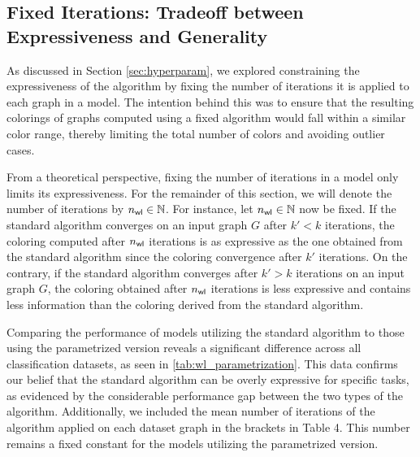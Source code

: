 \subsection{Fixed \wl Iterations: Tradeoff between Expressiveness and Generality}
As discussed in Section \ref{sec:hyperparam}, we explored constraining the expressiveness of the \wl algorithm by fixing the number of iterations it is applied to each graph in a \wlnn model. The intention behind this was to ensure that the resulting colorings of graphs computed using a fixed \wl algorithm would fall within a similar color range, thereby limiting the total number of colors and avoiding outlier cases.

From a theoretical perspective, fixing the number of \wl iterations in a \wlnn model only limits its expressiveness. For the remainder of this section, we will denote the number of \wl iterations by $n_{\textsf{wl}} \in \mathbb{N}$.
For instance, let $n_{\textsf{wl}} \in \mathbb{N}$ now be fixed. If the standard \wl algorithm converges on an input graph $G$ after $k' < k$ iterations, the coloring computed after $n_{\textsf{wl}}$ iterations is as expressive as the one obtained from the standard \wl algorithm since the coloring convergence after $k'$ iterations. On the contrary, if the standard \wl algorithm converges after $k' > k$ iterations on an input graph $G$, the coloring obtained after $n_{\textsf{wl}}$ iterations is less expressive and contains less information than the coloring derived from the standard \wl algorithm.

Comparing the performance of \wlnn models utilizing the standard \wl algorithm to those using the parametrized version reveals a significant difference across all classification datasets, as seen in \cref{tab:wl_parametrization}. This data confirms our belief that the standard \wl algorithm can be overly expressive for specific tasks, as evidenced by the considerable performance gap between the two types of the algorithm. Additionally, we included the mean number of iterations of the \wl algorithm applied on each dataset graph in the brackets in Table 4. This number remains a fixed constant for the models utilizing the parametrized version.

